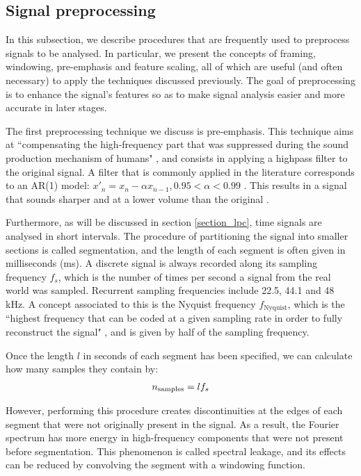 \documentclass[../main.tex]{subfiles}
\begin{document}
\subsection{Signal preprocessing} \label{subsection_preproc}
In this subsection, we describe procedures that are frequently used to preprocess signals to be analysed. In particular, we present the concepts of framing, windowing, pre-emphasis and feature scaling, all of which are useful (and often necessary) to apply the techniques discussed previously. The goal of preprocessing is to enhance the signal's features so as to make signal analysis easier and more accurate in later stages.
\par The first preprocessing technique we discuss is pre-emphasis. This technique aims at ``compensating the high-frequency part that was suppressed during the sound production mechanism of humans" \cite{Jang1996}, and consists in applying a highpass filter to the original signal. A filter that is commonly applied in the literature corresponds to an AR(1) model: $x'_n = x_n - \alpha x_{n-1}, 0.95< \alpha < 0.99 $ \cite{Shimodaira2013}. This results in a signal that sounds sharper and at a lower volume than the original \cite{Jang1996}. 
\par Furthermore, as will be discussed in section \ref{section_lpc}, time signals are analysed in short intervals. The procedure of partitioning the signal into smaller sections is called segmentation, and the length of each segment is often given in milliseconds (ms). A discrete signal is always recorded along its sampling frequency $f_s$, which is the number of times per second a signal from the real world was sampled. Recurrent sampling frequencies include 22.5, 44.1 and 48 kHz. A concept associated to this is the Nyquist frequency $f_{\text{Nyquist}}$, which is the ``highest frequency that can be coded at a given sampling rate in order to fully reconstruct the signal" \cite{Weisstein2015b}, and is given by half of the sampling frequency.
\par Once the length $l$ in seconds of each segment has been specified, we can calculate how many samples they contain by:
\begin{align*}
n_{\text{samples}} = l \* f_s
\end{align*}
\par However, performing this procedure creates discontinuities at the edges of each segment that were not originally present in the signal. As a result, the Fourier spectrum has more energy in high-frequency components \cite{NationalInstruments2015} that were not present before segmentation. This phenomenon is called spectral leakage, and its effects can be reduced by convolving the segment with a windowing function. 
\end{document}
